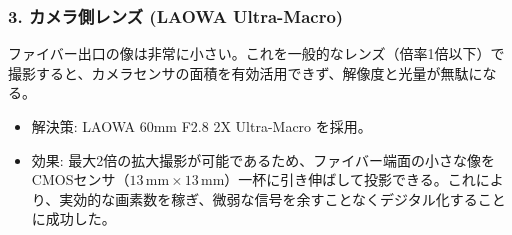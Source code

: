 \subsubsection{3. カメラ側レンズ (LAOWA Ultra-Macro)}
ファイバー出口の像は非常に小さい。これを一般的なレンズ（倍率1倍以下）で撮影すると、カメラセンサの面積を有効活用できず、解像度と光量が無駄になる。
\begin{itemize}
    \item 解決策: LAOWA 60mm F2.8 2X Ultra-Macro を採用。
    \item 効果: 最大2倍の拡大撮影が可能であるため、ファイバー端面の小さな像をCMOSセンサ（$13\,\mathrm{mm} \times 13\,\mathrm{mm}$）一杯に引き伸ばして投影できる。これにより、実効的な画素数を稼ぎ、微弱な信号を余すことなくデジタル化することに成功した\cite{Takeda2023}。
\end{itemize}